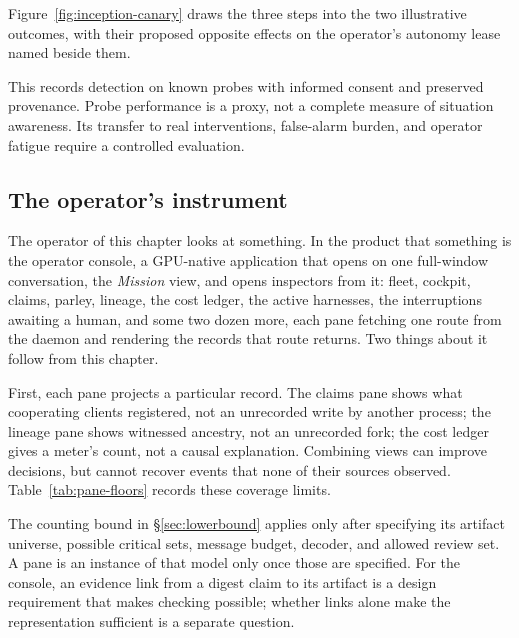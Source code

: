 \documentclass[11pt,a4paper]{article}
\theoremstyle{definition}
\theoremstyle{plain}
\begin{document}

Figure~\ref{fig:inception-canary} draws the three steps into the
two illustrative outcomes, with their proposed opposite effects on the
operator's autonomy lease named beside them.

This records detection on known probes with informed consent and preserved
provenance. Probe performance is a proxy, not a complete measure of situation
awareness. Its transfer to real interventions, false-alarm burden, and
operator fatigue require a controlled evaluation.

\subsection{The operator's instrument}\label{sec:operator-instrument}

The operator of this chapter looks at something. In the product that
something is the operator console, a GPU-native application that opens on
one full-window conversation, the \emph{Mission} view, and opens inspectors
from it: fleet, cockpit, claims, parley, lineage, the cost ledger, the active
harnesses, the interruptions awaiting a human, and some two dozen more, each
pane fetching one route from the daemon and rendering the records that route
returns. Two things about it follow from this chapter.

First, each pane projects a particular record. The claims pane shows what
cooperating clients registered, not an unrecorded write by another process;
the lineage pane shows witnessed ancestry, not an unrecorded fork; the cost
ledger gives a meter's count, not a causal explanation. Combining views can
improve decisions, but cannot recover events that none of their sources observed.
Table~\ref{tab:pane-floors} records these coverage limits.

The counting bound in \S\ref{sec:lowerbound} applies only after specifying its
artifact universe, possible critical sets, message budget, decoder, and allowed
review set. A pane is an instance of that model only once those are specified.
For the console, an evidence link from a digest claim to its artifact is a
design requirement that makes checking possible; whether links alone make the
representation sufficient is a separate question.
\end{document}
